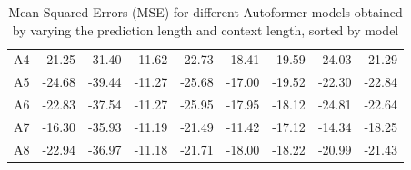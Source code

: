 \begin{table}[]
{\begin{tabular}{ccccccccc}
    \cellcolor[HTML]{FFFFFF}A4 & \cellcolor[HTML]{FFDA81}-21.25 & \cellcolor[HTML]{F8696B}-31.40 & \cellcolor[HTML]{FDEA83}-11.62 & \cellcolor[HTML]{FB8F73}-22.73 & \cellcolor[HTML]{F9E983}-18.41 & \cellcolor[HTML]{FAE983}-19.59 & \cellcolor[HTML]{8FCA7D}-24.03 & \cellcolor[HTML]{FDC27C}-21.29 \\
    \cellcolor[HTML]{FFFFFF}A5 & \cellcolor[HTML]{85C77C}-24.68 & \cellcolor[HTML]{95CC7D}-39.44 & \cellcolor[HTML]{FCAA78}-11.27 & \cellcolor[HTML]{FFE884}-25.68 & \cellcolor[HTML]{FED881}-17.00 & \cellcolor[HTML]{FFEB84}-19.52 & \cellcolor[HTML]{F3E783}-22.30 & \cellcolor[HTML]{FCEA83}-22.84 \\
    \cellcolor[HTML]{FFFFFF}A6 & \cellcolor[HTML]{DAE081}-22.83 & \cellcolor[HTML]{F1E783}-37.54 & \cellcolor[HTML]{FCAE79}-11.27 & \cellcolor[HTML]{FDEA83}-25.95 & \cellcolor[HTML]{FFEB84}-17.95 & \cellcolor[HTML]{FBA076}-18.12 & \cellcolor[HTML]{63BE7B}-24.81 & \cellcolor[HTML]{FFE984}-22.64 \\
    \rowcolor[HTML]{F8696B} 
    \cellcolor[HTML]{FFFFFF}A7 & -16.30                         & \cellcolor[HTML]{FECE7F}-35.93 & \cellcolor[HTML]{F9726D}-11.19 & -21.49                         & -11.42                         & -17.12                         & -14.34                         & -18.25                         \\
    \cellcolor[HTML]{FFFFFF}A8 & \cellcolor[HTML]{D5DF81}-22.94 & \cellcolor[HTML]{FFE583}-36.97 & \cellcolor[HTML]{F8696B}-11.18 & \cellcolor[HTML]{F9706D}-21.71 & \cellcolor[HTML]{FEEA83}-18.00 & \cellcolor[HTML]{FCA577}-18.22 & \cellcolor[HTML]{FED981}-20.99 & \cellcolor[HTML]{FDC67D}-21.43
    \end{tabular}%
    }
    \caption{Mean Squared Errors (MSE) for different Autoformer models obtained by varying the prediction length and context length, sorted by model}
    \label{A1_M}
    \end{table}


